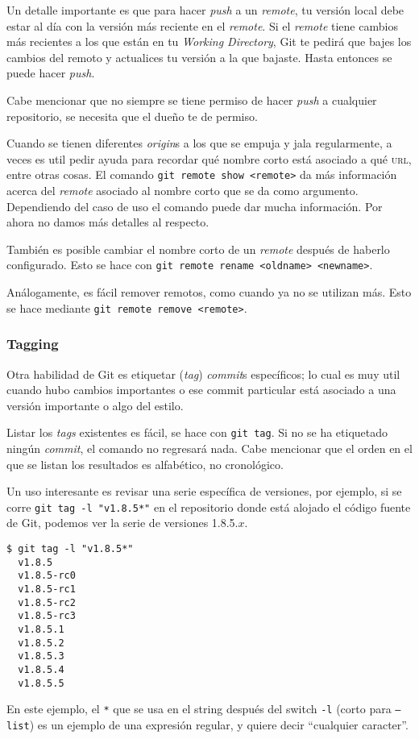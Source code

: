 \documentclass[spanish, 12pt, a4paper]{article}
\begin{document}
Un detalle importante es que para hacer \textit{push} a un \textit{remote}, tu
versión local debe estar al día con la versión más reciente en el
\textit{remote}.
Si el \textit{remote} tiene cambios más recientes a los que están en tu
\textit{Working Directory}, Git te pedirá que bajes los cambios del remoto y
actualices tu versión a la que bajaste.
Hasta entonces se puede hacer \textit{push}.

Cabe mencionar que no siempre se tiene permiso de hacer \textit{push} a
cualquier repositorio, se necesita que el dueño te de permiso.

Cuando se tienen diferentes \textit{origin}s a los que se empuja y jala
regularmente, a veces es util pedir ayuda para recordar qué nombre corto está
asociado a qué \textsc{url}, entre otras cosas.
El comando \texttt{git remote show <remote>} da más información acerca del
\textit{remote} asociado al nombre corto que se da como argumento.
Dependiendo del caso de uso el comando puede dar mucha información.
Por ahora no damos más detalles al respecto.

También es posible cambiar el nombre corto de un \textit{remote} después de
haberlo configurado.
Esto se hace con \texttt{git remote rename <oldname> <newname>}.

Análogamente, es fácil remover remotos, como cuando ya no se utilizan más.
Esto se hace mediante \texttt{git remote remove <remote>}.

\subsubsection{Tagging}
Otra habilidad de Git es etiquetar (\textit{tag}) \textit{commit}s específicos;
lo cual es muy util cuando hubo cambios importantes o ese commit particular está
asociado a una versión importante o algo del estilo.

Listar los \textit{tags} existentes es fácil, se hace con \texttt{git tag}.
Si no se ha etiquetado ningún \textit{commit}, el comando no regresará nada.
Cabe mencionar que el orden en el que se listan los resultados es alfabético, no
cronológico.

Un uso interesante es revisar una serie específica de versiones, por ejemplo, si
se corre \texttt{git tag -l "v1.8.5*"} en el repositorio donde está alojado el
código fuente de Git, podemos ver la serie de versiones 1.8.5.$x$.
\begin{lstlisting}
$ git tag -l "v1.8.5*"
  v1.8.5
  v1.8.5-rc0
  v1.8.5-rc1
  v1.8.5-rc2
  v1.8.5-rc3
  v1.8.5.1
  v1.8.5.2
  v1.8.5.3
  v1.8.5.4
  v1.8.5.5
\end{lstlisting}
En este ejemplo, el \texttt{*} que se usa en el string después del switch
\texttt{-l} (corto para \texttt{--list}) es un ejemplo de una expresión regular,
y quiere decir ``cualquier caracter''.
\end{document}
